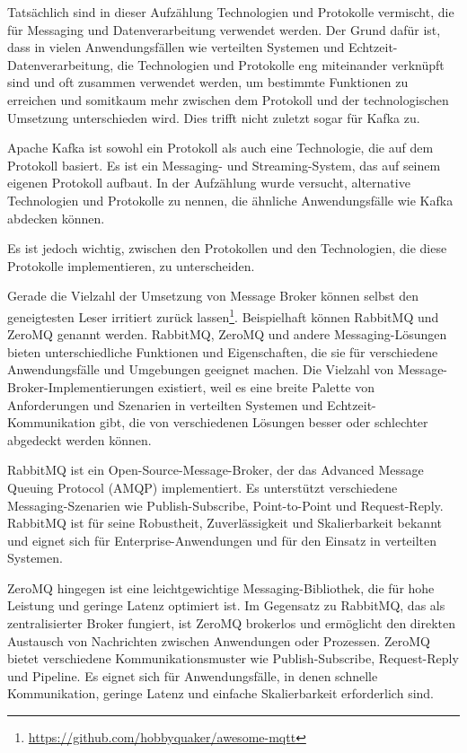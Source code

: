 Tatsächlich sind in dieser Aufzählung Technologien und Protokolle vermischt, die für Messaging und Datenverarbeitung verwendet werden. Der Grund dafür ist, dass in vielen Anwendungsfällen wie verteilten Systemen und Echtzeit-Datenverarbeitung, die Technologien und Protokolle eng miteinander verknüpft sind und oft zusammen verwendet werden, um bestimmte Funktionen zu erreichen und somitkaum mehr zwischen dem Protokoll und der technologischen Umsetzung unterschieden wird. Dies trifft nicht zuletzt sogar für Kafka zu. 

Apache Kafka ist sowohl ein Protokoll als auch eine Technologie, die auf dem Protokoll basiert. Es ist ein Messaging- und Streaming-System, das auf seinem eigenen Protokoll aufbaut. In der Aufzählung wurde versucht, alternative Technologien und Protokolle zu nennen, die ähnliche Anwendungsfälle wie Kafka abdecken können.

Es ist jedoch wichtig, zwischen den Protokollen und den Technologien, die diese Protokolle implementieren, zu unterscheiden.

Gerade die Vielzahl der Umsetzung von Message Broker können selbst den geneigtesten Leser irritiert zurück lassen\footnote{\url{https://github.com/hobbyquaker/awesome-mqtt}}. Beispielhaft können RabbitMQ und ZeroMQ genannt werden. RabbitMQ, ZeroMQ und andere Messaging-Lösungen bieten unterschiedliche Funktionen und Eigenschaften, die sie für verschiedene Anwendungsfälle und Umgebungen geeignet machen. Die Vielzahl von Message-Broker-Implementierungen existiert, weil es eine breite Palette von Anforderungen und Szenarien in verteilten Systemen und Echtzeit-Kommunikation gibt, die von verschiedenen Lösungen besser oder schlechter abgedeckt werden können.

RabbitMQ ist ein Open-Source-Message-Broker, der das Advanced Message Queuing Protocol (AMQP) implementiert. Es unterstützt verschiedene Messaging-Szenarien wie Publish-Subscribe, Point-to-Point und Request-Reply. RabbitMQ ist für seine Robustheit, Zuverlässigkeit und Skalierbarkeit bekannt und eignet sich für Enterprise-Anwendungen und für den Einsatz in verteilten Systemen.

ZeroMQ hingegen ist eine leichtgewichtige Messaging-Bibliothek, die für hohe Leistung und geringe Latenz optimiert ist. Im Gegensatz zu RabbitMQ, das als zentralisierter Broker fungiert, ist ZeroMQ brokerlos und ermöglicht den direkten Austausch von Nachrichten zwischen Anwendungen oder Prozessen. ZeroMQ bietet verschiedene Kommunikationsmuster wie Publish-Subscribe, Request-Reply und Pipeline. Es eignet sich für Anwendungsfälle, in denen schnelle Kommunikation, geringe Latenz und einfache Skalierbarkeit erforderlich sind.



